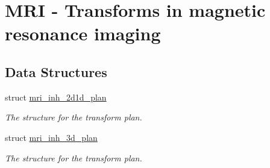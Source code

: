 \hypertarget{group__mri}{
\section{MRI - Transforms in magnetic resonance imaging}
\label{group__mri}
}
\subsection*{Data Structures}
\begin{CompactItemize}
\item 
struct \hyperlink{structmri__inh__2d1d__plan}{mri\_\-inh\_\-2d1d\_\-plan}
\begin{CompactList}\small\item\em The structure for the transform plan. \item\end{CompactList}\item 
struct \hyperlink{structmri__inh__3d__plan}{mri\_\-inh\_\-3d\_\-plan}
\begin{CompactList}\small\item\em The structure for the transform plan. \item\end{CompactList}\end{CompactItemize}
